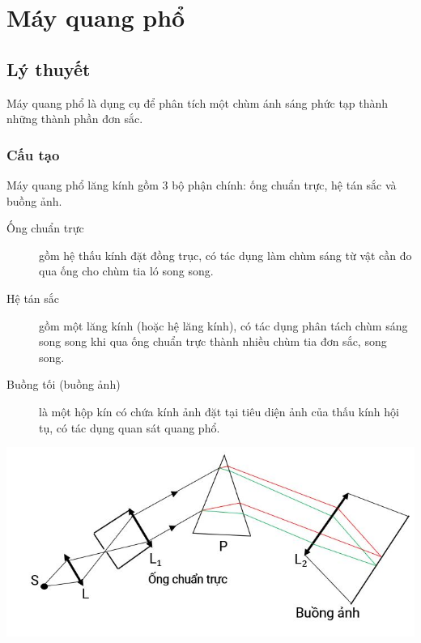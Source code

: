 
\chapter[Máy quang phổ]{Máy quang phổ}

\section{Lý thuyết}
Máy quang phổ là dụng cụ để phân tích một chùm ánh sáng phức tạp thành những thành phần đơn sắc.
\subsection{Cấu tạo}
Máy quang phổ lăng kính gồm 3 bộ phận chính: ống chuẩn trực, hệ tán sắc và buồng ảnh.
\begin{description}
	\item[Ống chuẩn trực] gồm hệ thấu kính đặt đồng trục, có tác dụng làm chùm sáng từ vật cần đo qua ống cho chùm tia ló song song.
	\item[Hệ tán sắc] gồm một lăng kính (hoặc hệ lăng kính), có tác dụng phân tách chùm sáng song song khi qua ống chuẩn trực thành nhiều chùm tia đơn sắc, song song.
	\item[Buồng tối (buồng ảnh)] là một hộp kín có chứa kính ảnh đặt tại tiêu diện ảnh của thấu kính hội tụ, có tác dụng quan sát quang phổ.
\end{description} 	
\begin{center}
	\includegraphics[scale=1]{../figs/VN12-PH-36-L-021-1-1.JPG}
\end{center}

